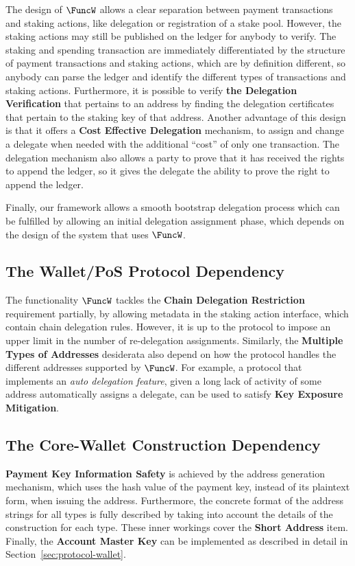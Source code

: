 The design of $\FuncW$ allows a clear separation between payment transactions and staking actions, like delegation or registration of a stake pool. However, the staking actions may still be published on the ledger for anybody to verify.  The staking and spending transaction are immediately differentiated  by the structure of payment transactions and staking actions, which are by definition different, so anybody can parse the ledger and identify the different types of transactions and staking actions. Furthermore, it is possible to verify {\bf the Delegation Verification} that pertains to an address by finding the delegation certificates that pertain to the staking key of that address. Another advantage of this design is that it offers a {\bf Cost Effective Delegation} mechanism, to assign and change a delegate when needed with the additional ``cost'' of only one transaction. The delegation mechanism also allows a party to prove that it has received the rights to append the ledger, so it gives the delegate the ability to  prove the right to append the ledger.

Finally, our framework allows a smooth bootstrap delegation process which can be fulfilled by allowing an initial delegation assignment phase, which depends on the design of the system that uses $\FuncW$.

\subsection{The Wallet/PoS Protocol Dependency}

The functionality $\FuncW$ tackles the {\bf Chain Delegation Restriction} requirement partially, by allowing metadata in the staking action interface, which contain chain delegation rules. However, it is up to the protocol to impose an upper limit in the number of re-delegation assignments. Similarly, the {\bf Multiple Types of Addresses} desiderata also depend on how the protocol handles the different addresses supported by $\FuncW$. For example, a protocol that implements an \textit{auto delegation feature}, \ie given a long lack of activity of some address automatically assigns a delegate, can be used to satisfy {\bf Key Exposure Mitigation}.

\subsection{The Core-Wallet Construction Dependency}

{\bf Payment Key Information Safety} is achieved by the address generation mechanism, which uses the hash value of the payment key, instead of its plaintext form, when issuing the address. Furthermore, the concrete format of the address strings for all types is fully described by taking into account the details of the construction for each type. These inner workings cover the {\bf Short Address} item. Finally, the {\bf Account Master Key} can be implemented as described in detail in Section~\ref{sec:protocol-wallet}.

